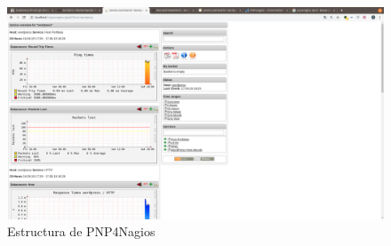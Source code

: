 \begin{figure}[H]
	\centering
	\includegraphics[scale=0.2]{imagenes/modelado/pnp4nagioscaptura.png}
	\caption{Estructura de PNP4Nagios} \label{pnp4nagios_estructura}
\end{figure}
\newpage
